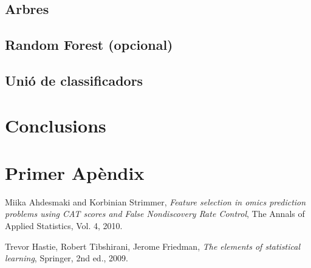 \documentclass[a4paper,10pt]{article}
\begin{document}
\subsection{Arbres}
\subsection{Random Forest (opcional)}
\subsection{Unió de classificadors}
\section{Conclusions}


\appendix
\section{Primer Apèndix}

\begin{thebibliography}{9}


  Miika Ahdesmaki and Korbinian Strimmer,
  \emph{Feature selection in omics prediction problems using CAT scores and False Nondiscovery Rate Control},
  The Annals of Applied Statistics, 
  Vol. 4,
  2010.

  Trevor Hastie, Robert Tibshirani, Jerome Friedman,
  \emph{The elements of statistical learning},
  Springer,
  2nd ed., 
  2009.


\end{thebibliography}
\end{document}
